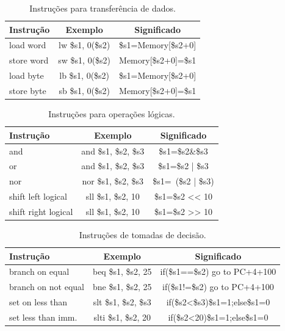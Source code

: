 \documentclass[10pt,twocolumn,letterpaper]{article}
\begin{document}
\begin{table}[h]
\renewcommand{\tablename}{Tabela}
\begin{center}
\begin{tabular}{|l|c||c|}
\hline
Instrução & Exemplo & Significado \\
\hline\hline
load word & lw \$s1, 0(\$s2) & \$s1=Memory[\$s2+0]\\
store word & sw \$s1, 0(\$s2) & Memory[\$s2+0]=\$s1\\
load byte & lb \$s1, 0(\$s2) & \$s1=Memory[\$s2+0]\\
store byte & sb \$s1, 0(\$s2) & Memory[\$s2+0]=\$s1\\
\hline
\end{tabular}
\end{center}
\caption{Instruções para transferência de dados.}
\end{table}

\begin{table}[h]
\renewcommand{\tablename}{Tabela}
\begin{center}
\begin{tabular}{|l|c||c|}
\hline
Instrução & Exemplo & Significado \\
\hline\hline
and & and \$s1, \$s2, \$s3 & \$s1=\$s2\&\$s3\\
or & and \$s1, \$s2, \$s3 & \$s1=\$s2 | \$s3\\
nor & nor \$s1, \$s2, \$s3 & \$s1=~(\$s2 | \$s3)\\
shift left logical & sll \$s1, \$s2, 10 & \$s1=\$s2 << 10\\
shift right logical & sll \$s1, \$s2, 10 & \$s1=\$s2 >> 10\\
\hline
\end{tabular}
\end{center}
\caption{Instruções para operações lógicas.}
\end{table}

\begin{table}[h]
\renewcommand{\tablename}{Tabela}
\begin{center}
\begin{tabular}{|l|c||c|}
\hline
Instrução & Exemplo & Significado \\
\hline\hline
branch on equal & beq \$s1, \$s2, 25 & if(\$s1==\$s2) go to PC+4+100\\
branch on not equal & bne \$s1, \$s2, 25 & if(\$s1!=\$s2) go to PC+4+100\\
set on less than & slt \$s1, \$s2, \$s3 & if(\$s2<\$s3)\$s1=1;else\$s1=0\\
set less than imm. & slti \$s1, \$s2, 20 & if(\$s2<20)\$s1=1;else\$s1=0\\
\hline
\end{tabular}
\end{center}
\caption{Instruções de tomadas de decisão.}
\end{table}
\end{document}
